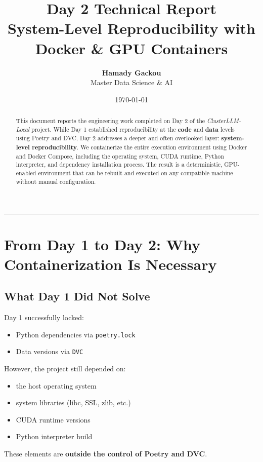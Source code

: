 \documentclass[11pt, a4paper]{article}
\title{\textbf{\Huge Day 2 Technical Report}\\
\Large System-Level Reproducibility with Docker \& GPU Containers}
\author{\textbf{Hamady Gackou} \\ Master Data Science \& AI}
\date{\today}
\begin{document}
\maketitle
\thispagestyle{empty}

\begin{abstract}
This document reports the engineering work completed on Day 2 of the \textit{ClusterLLM-Local} project.
While Day 1 established reproducibility at the \textbf{code} and \textbf{data} levels using Poetry and DVC,
Day 2 addresses a deeper and often overlooked layer: \textbf{system-level reproducibility}.
We containerize the entire execution environment using Docker and Docker Compose, including the operating system,
CUDA runtime, Python interpreter, and dependency installation process.
The result is a deterministic, GPU-enabled environment that can be rebuilt and executed on any compatible machine
without manual configuration.
\end{abstract}

\tableofcontents
\vspace{1cm}
\hrule
\vspace{1cm}

\section{From Day 1 to Day 2: Why Containerization Is Necessary}

\subsection{What Day 1 Did Not Solve}
Day 1 successfully locked:
\begin{itemize}
    \item Python dependencies via \texttt{poetry.lock}
    \item Data versions via \texttt{DVC}
\end{itemize}

However, the project still depended on:
\begin{itemize}
    \item the host operating system
    \item system libraries (libc, SSL, zlib, etc.)
    \item CUDA runtime versions
    \item Python interpreter build
\end{itemize}

These elements are \textbf{outside the control of Poetry and DVC}.
\end{document}
